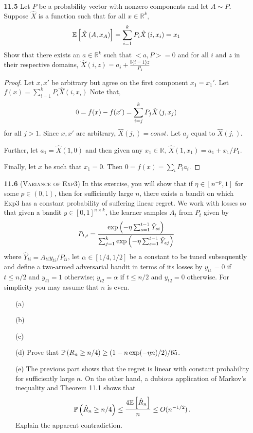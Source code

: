 \noindent\textbf{11.5} Let $P$ be a probability vector with nonzero components and let $A\sim P$. Suppose $\hat{X}$ is a function such that for all $x\in \mathbb{R}^k$,
\begin{equation}
    \mathbb{E}\left[\hat{X}\left(A, x_{A}\right)\right]=\sum_{i=1}^{k} P_{i} \hat{X}\left(i, x_{i}\right)=x_{1}\notag
\end{equation}
Show that there exists an $a\in \mathbb{R}^k$ such that $<a,P>=0$ and for all $i$ and $z$ in their respective domains, $\hat{X}(i, z)=a_{i}+\frac{\mathbb{I}\{i=1\} z}{P_{1}}$
\begin{proof}
    Let $x, x'$ be arbitrary but agree on the first component $x_1=x_1'$. Let $f(x)=\sum_{i=1}^{k} P_{i} \hat{X}\left(i, x_{i}\right)$ Note that,
    \begin{equation}
        0=f(x)-f(x')=\sum_{i=j}^{k} P_{j} \hat{X}\left(j, x_{j}\right)\notag
    \end{equation}
    for all $j>1$. Since $x, x'$ are arbitrary, $\hat{X}(j, )=const$. Let $a_j$ equal to $\hat{X}(j, )$.
    \par Further, let $a_1=\hat{X}(1, 0)$ and then given any $x_1\in \mathbb{R}$, $\hat{X}\left(1, x_{1}\right)=a_{1}+x_{1} / P_{1}$.
    \par Finally, let $x$ be such that $x_1=0$. Then $0=f(x)=\sum_{i} P_{i} a_{i}$.
\end{proof}

\noindent\textbf{11.6}
(\textsc{Variance of Exp3}) In this exercise, you will show that 
if $\eta\in[n^{-p},1]$ for some $p\in(0,1)$,
then for sufficiently large $n$,
there exists a bandit on which Exp3 has a constant probability of suffering linear regret. We work with losses so that given a bandit $y \in[0, 1]^{n\times k}$, the learner samples $A_t$ from $P_t$ given by
\begin{align*}
    P_{t,i} = \frac{ \exp\left(-\eta\sum_{s=1}^{t-1}\hat{Y}_{si} \right) }{ \sum_{j=1}^k \exp\left(-\eta\sum_{s=1}^{t-1}\hat{Y}_{sj} \right) }
\end{align*}
where $\hat{Y}_{ti}=A_{ti}y_{ti}/P_{ti}$, let $\alpha \in [1/4,1/2]$ be a constant to be tuned subsequently and define a two-armed adversarial bandit in terms of its losses by $y_{t1}=0$ if $t\le n/2$ and $y_{t1}=1$ otherwise; $y_{t2}=\alpha$ if $t\le n/2$ and $y_{t2}=0$ otherwise. For simplicity you may assume that $n$ is even. 
\begin{enumerate}
    \item[(a)] 
    \item[(b)]
    \item[(c)]
    \item[(d)] Prove that $\mathbb{P} \left(R_n\ge n/4\right) \ge (1-n\exp(-\eta n)/2)/65$.
    \item[(e)] The previous part shows that the regret is linear with constant probability for sufficiently large $n$. On the other hand, a dubious application of Markov’s inequality and Theorem 11.1 shows that
    \begin{align*}
        \mathbb{P} \left(\hat{R}_n \ge n/4\right)\le \frac{4\mathbb{E} \left[\hat{R}_n\right]}{n} \le O(n^{-1/2})\,.
    \end{align*}
    Explain the apparent contradiction.
\end{enumerate}


